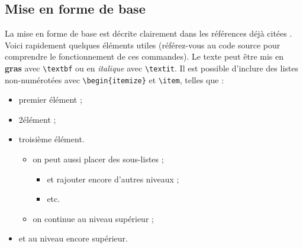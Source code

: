 \documentclass{ceri}
\begin{document}
\subsection{Mise en forme de base}
\label{sec:miseenforme}
La mise en forme de base est décrite clairement dans les références déjà citées \cite{Wikibooks2010, Wikibooks2011}. Voici rapidement quelques éléments utiles (référez-vous au code source pour comprendre le fonctionnement de ces commandes).
Le texte peut être mis en \textbf{gras} avec \texttt{\textbackslash{}textbf} ou en \textit{italique} avec \texttt{\textbackslash{}textit}. Il est possible d'inclure des listes non-numérotées avec \texttt{\textbackslash{}begin\{itemize\}} et \texttt{\textbackslash{}item}, telles que :	
\begin{itemize}
	\item premier élément ;
	\item 2\ieme élément ;
	\item troisième élément.
	\begin{itemize}
		\item on peut aussi placer des sous-listes ;
		\begin{itemize}
			\item et rajouter encore d'autres niveaux ;
			\item etc.
		\end{itemize}
		\item on continue au niveau supérieur ;
	\end{itemize}
	\item et au niveau encore supérieur.
\end{itemize}
\end{document}
